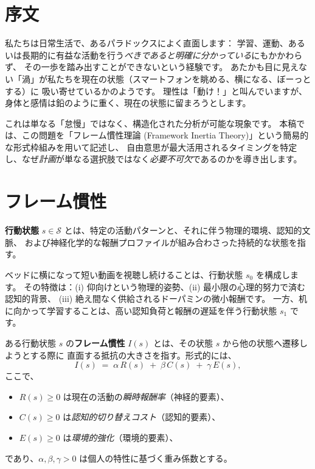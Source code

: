
\section{序文}\label{sec:intro}

私たちは日常生活で、あるパラドックスによく直面します：
学習、運動、あるいは長期的に有益な活動を行う\emph{べきであると明確に分かっている}にもかかわらず、
その一歩を踏み出すことができないという経験です。
あたかも目に見えない「渦」が私たちを現在の状態（スマートフォンを眺める、横になる、ぼーっとする）に
吸い寄せているかのようです。
理性は「動け！」と叫んでいますが、身体と感情は鉛のように重く、現在の状態に留まろうとします。

これは単なる「怠慢」ではなく、構造化された分析が可能な現象です。
本稿では、この問題を「フレーム慣性理論 (Framework Inertia Theory)」という簡易的な形式枠組みを用いて記述し、
自由意思が最大活用されるタイミングを特定し、なぜ\emph{計画}が単なる選択肢ではなく\emph{必要不可欠}であるのかを導き出します。

\section{フレーム慣性}\label{sec:inertia}

\begin{definition}[行動状態]\label{def:state}
\textbf{行動状態} $s \in \mathcal{S}$ とは、特定の活動パターンと、それに伴う物理的環境、認知的文脈、
および神経化学的な報酬プロファイルが組み合わさった持続的な状態を指す。
\end{definition}

\begin{examplebox}
ベッドに横になって短い動画を視聴し続けることは、行動状態 $s_0$ を構成します。
その特徴は：(i) 仰向けという物理的姿勢、(ii) 最小限の心理的努力で済む認知的背景、
(iii) 絶え間なく供給されるドーパミンの微小報酬です。
一方、机に向かって学習することは、高い認知負荷と報酬の遅延を伴う行動状態 $s_1$ です。
\end{examplebox}

\begin{definition}[フレーム慣性]\label{def:inertia}
ある行動状態 $s$ の\textbf{フレーム慣性} $I(s)$ とは、その状態 $s$ から他の状態へ遷移しようとする際に
直面する抵抗の大きさを指す。形式的には、
\[
  I(s) \;=\; \alpha \, R(s) \;+\; \beta \, C(s) \;+\; \gamma \, E(s),
\]
ここで、
\begin{itemize}[nosep]
  \item $R(s) \geq 0$ は現在の活動の\emph{瞬時報酬率}（神経的要素）、
  \item $C(s) \geq 0$ は\emph{認知的切り替えコスト}（認知的要素）、
  \item $E(s) \geq 0$ は\emph{環境的強化}（環境的要素）、
\end{itemize}
であり、$\alpha, \beta, \gamma > 0$ は個人の特性に基づく重み係数とする。
\end{definition}

